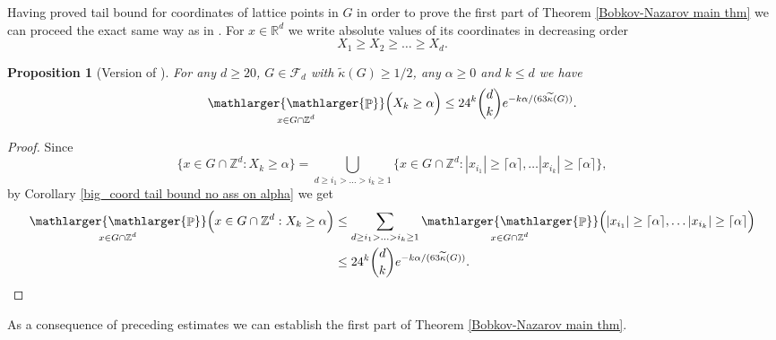 \documentclass[a4paper,oneside, reqno]{amsart}
\numberwithin{equation}{section}
\newtheorem{Prop}[Thm]{Proposition}
\theoremstyle{definition}%
\theoremstyle{definition}
\theoremstyle{definition}%
\theoremstyle{definition}
\newcommand{\Pro}{\mathop{\mathbb{P}}}
\newcommand{\Z}{\mathbb{Z}}
\newcommand{\R}{\mathbb{R}}
\newcommand{\spr}[1]{\underset{_{\substack{#1}}}{\mathlarger{\mathlarger{\Pro}}}}
\begin{document}
Having proved tail bound for coordinates of lattice points in $G$ in order to prove the first part of Theorem \ref{Bobkov-Nazarov main thm} we can proceed the exact same way as in \cite[Sections 4,5]{bob-naz}.
For $x \in \R^d$ we write absolute values of its coordinates in decreasing order
\[
X_1 \ge X_2 \ge \ldots \ge X_d.
\]
\begin{Prop}[Version of {\cite[Proposition 4.1]{bob-naz}}] \label{ordered tail bound}
    For any $d \ge 20$, $G \in \mathcal{F}_d$ with $\widetilde{\kappa}(G) \ge 1/2$, any $\alpha \ge 0$ and $k \le d$ we have
    \[
    \spr{x \in G \cap \Z^d} \Big( X_k \ge \alpha \Big)\le 24^k \binom{d}{k} e^{-k \alpha/(63\widetilde{\kappa}(G))}.
    \]
\end{Prop}
\begin{proof}
    Since 
    \[
    \Big\{ x \in G \cap \Z^d: X_k \ge \alpha \Big\}= \bigcup_{d \ge i_1 > \ldots>i_k \ge 1} \Big\{x \in G \cap \Z^d:|x_{i_1}| \ge \lceil \alpha \rceil,\ldots |x_{i_k}| \ge \lceil \alpha \rceil \Big\},
    \]
by Corollary \ref{big_coord tail bound no ass on alpha} we get 
\begin{align*}
   \spr{x \in G \cap \Z^d} \Big(x \in G \cap \Z^d: X_k \ge \alpha \Big) &\le \sum_{d \ge i_1 > \ldots>i_k \ge 1} \spr{x \in G \cap \Z^d} \Big(|x_{i_1}| \ge \lceil \alpha \rceil,\ldots |x_{i_k}| \ge \lceil \alpha \rceil \Big) \\
    &\le 24^k \binom{d}{k} e^{-k\alpha/(63 \widetilde{\kappa}(G))}.
\end{align*}
\end{proof}
As a consequence of preceding estimates we can establish the first part of Theorem \ref{Bobkov-Nazarov main thm}.
\end{document}
